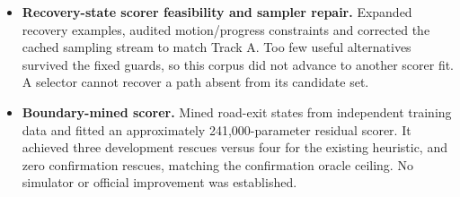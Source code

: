 \begin{itemize}
\item \textbf{Recovery-state scorer feasibility and sampler repair.} Expanded recovery examples, audited motion/progress constraints and corrected the cached sampling stream to match Track A. Too few useful alternatives survived the fixed guards, so this corpus did not advance to another scorer fit. A selector cannot recover a path absent from its candidate set.
\item \textbf{Boundary-mined scorer.} Mined road-exit states from independent training data and fitted an approximately 241,000-parameter residual scorer. It achieved three development rescues versus four for the existing heuristic, and zero confirmation rescues, matching the confirmation oracle ceiling. No simulator or official improvement was established.
\end{itemize}

